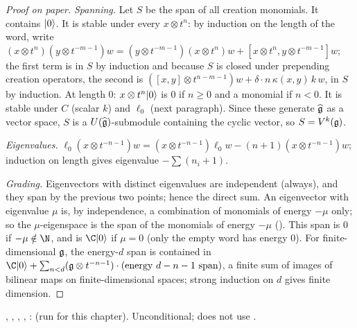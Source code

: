 \begin{proof}[Proof on paper]
\emph{Spanning.} Let $S$ be the span of all creation monomials. It contains $|0\rangle$. It is stable
under every $x\otimes t^n$: by induction on the length of the word, write
$(x\otimes t^n)(y\otimes t^{-m-1})w = (y\otimes t^{-m-1})(x\otimes t^n)w + [x\otimes t^n, y\otimes t^{-m-1}]w$;
the first term is in $S$ by induction and because $S$ is closed under prepending creation operators,
the second is $([x,y]\otimes t^{n-m-1})w + \delta\cdot n\,\kappa(x,y)\,k\,w$, in $S$ by induction. At length
$0$: $x\otimes t^n|0\rangle$ is $0$ if $n\ge0$ and a monomial if $n<0$. It is stable under $C$ (scalar
$k$) and $\ell_0$ (next paragraph). Since these generate $\widehat{\mathfrak{g}}$ as a vector space, $S$ is a
$U(\widehat{\mathfrak{g}})$-submodule containing the cyclic vector, so $S = V^k(\mathfrak{g})$.

\emph{Eigenvalues.} $\ell_0(x\otimes t^{-n-1})w = (x\otimes t^{-n-1})\ell_0w - (n+1)(x\otimes t^{-n-1})w$;
induction on length gives eigenvalue $-\sum(n_i+1)$.

\emph{Grading.} Eigenvectors with distinct eigenvalues are independent (always), and they span by the
previous two points; hence the direct sum. An eigenvector with eigenvalue $\mu$ is, by independence,
a combination of monomials of energy $-\mu$ only; so the $\mu$-eigenspace is the span of the monomials
of energy $-\mu$ (\allowbreak{}). This span is $0$ if $-\mu\notin\N$, and is $\C\ltwovac$ if
$\mu=0$ (only the empty word has energy $0$). For finite-dimensional $\mathfrak{g}$, the energy-$d$ span is
contained in $\C\ltwovac + \sum_{n<d}(\ltwog\otimes t^{-n-1})\cdot(\text{energy }d-n-1\text{ span})$, a finite
sum of images of bilinear maps on finite-dimensional spaces; strong induction on $d$ gives finite
dimension.
\end{proof}

\begin{status}
\allowbreak{}\allowbreak{}\allowbreak{}\allowbreak{}, \allowbreak{}\allowbreak{}\allowbreak{},
\allowbreak{}\allowbreak{}\allowbreak{}\allowbreak{}\allowbreak{}\allowbreak{}\allowbreak{}, \allowbreak{}\allowbreak{}\allowbreak{}\allowbreak{},
\allowbreak{}\allowbreak{}\allowbreak{}: 
(run for this chapter). Unconditional; does not use .
\end{status}

